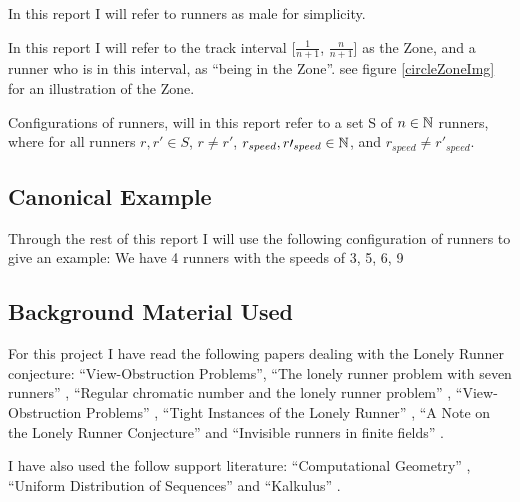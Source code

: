 In this report I will refer to runners as male for simplicity.

\begin{defi}
\label{def:theZone}
In this report I will refer to the track interval [$\frac{1}{n + 1}$, $\frac{n}{n+1}$] as the Zone, and a runner who is in this interval, as ``being in the Zone''. see figure \ref{circleZoneImg} for an illustration of the Zone.
\end{defi}

\begin{defi}
\label{def:config}
Configurations of runners, will in this report refer to a set S of $n \in \mathbb{N}$ runners, where for all runners $r, r\prime \in S$, $r \neq r\prime$, $r_{speed}, r\prime_{speed} \in \mathbb{N}$, and $r_{speed} \neq r\prime_{speed}$.
\end{defi}

\subsection{Canonical Example}
Through the rest of this report I will use the following configuration
of runners to give an example:
We have 4 runners with the speeds of 3, 5, 6, 9

\subsection{Background Material Used}
\label{background}
For this project I have read the following papers dealing with the Lonely Runner conjecture: ``View-Obstruction Problems''\cite{Bienia97flows.view-obstructions}, ``The lonely runner problem with seven runners'' \cite{serra_thelonely}, ``Regular chromatic number and the lonely runner problem'' \cite{Barajas2007479}, ``View-Obstruction Problems'' \cite{springerlink:10.1007/BF01832623}, ``Tight Instances of the Lonely Runner'' \cite{Goddyn96tightinstances}, ``A Note on the Lonely Runner Conjecture'' \cite{ANote} and ``Invisible runners in finite fields'' \cite{invis}.

I have also used the follow support literature:
``Computational Geometry'' \cite{citeulike:3347056}, ``Uniform Distribution of Sequences'' \cite{uniform} and ``Kalkulus'' \cite{kalkulus}.

